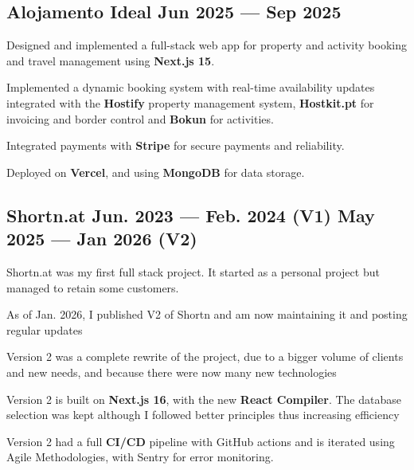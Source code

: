 \subsection{{Alojamento Ideal \hfill Jun 2025 --- Sep 2025}}
\begin{zitemize}
    \item Designed and implemented a full-stack web app for property and activity booking and travel management
using \textbf{Next.js 15}.
    \item Implemented a dynamic booking system with real-time availability updates integrated with the \textbf{Hostify} property
management system, \textbf{Hostkit.pt} for invoicing and border control and \textbf{Bokun} for activities.
    \item Integrated payments with \textbf{Stripe} for secure payments and reliability.
    \item Deployed on \textbf{Vercel}, and using \textbf{MongoDB} for data storage.
\end{zitemize}

\subsection{{Shortn.at \hfill Jun. 2023 --- Feb. 2024 (V1) May 2025 --- Jan 2026 (V2)}}
\begin{zitemize}
    \item Shortn.at was my first full stack project. It started as a personal project but managed to retain some customers.
    \item As of Jan. 2026, I published V2 of Shortn and am now maintaining it and posting regular updates
    \item Version 2 was a complete rewrite of the project, due to a bigger volume of clients and new needs, and because
there were now many new technologies
    \item Version 2 is built on \textbf{Next.js 16}, with the new \textbf{React Compiler}. The database selection was kept although I
followed better principles thus increasing efficiency
    \item Version 2 had a full \textbf{CI/CD} pipeline with GitHub actions and is iterated using Agile Methodologies, with Sentry for
error monitoring.
\end{zitemize}

